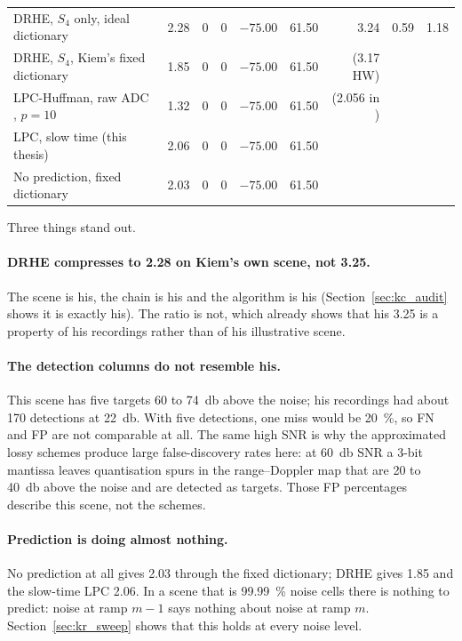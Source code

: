 \begin{table}[htbp]
\begin{tabular}{@{}lrrrrr@{\hskip 12pt}rrr@{}}
DRHE, $S_4$ only, ideal dictionary & 2.28 & 0 & 0 & $-75.00$ & 61.50 & 3.24 & 0.59 & 1.18\\
DRHE, $S_4$, Kiem's fixed dictionary & 1.85 & 0 & 0 & $-75.00$ & 61.50 & (3.17 HW) & & \\
LPC-Huffman, raw ADC \cite{meucci2022}, $p=10$  & 1.32 & 0 & 0 & $-75.00$ & 61.50 & (2.056 in \cite{meucci2022}) & & \\
LPC, slow time (this thesis)       & 2.06 & 0 & 0 & $-75.00$ & 61.50 & & & \\
No prediction, fixed dictionary    & 2.03 & 0 & 0 & $-75.00$ & 61.50 & & & \\
\bottomrule
\end{tabular}
\end{table}

\noindent
Three things stand out.

\paragraph{DRHE compresses to 2.28 on Kiem's own scene, not 3.25.} The scene
is his, the chain is his and the algorithm is his (Section~\ref{sec:kc_audit}
shows it is exactly his). The ratio is not, which already shows that his 3.25
is a property of his recordings rather than of his illustrative scene.

\paragraph{The detection columns do not resemble his.} This scene has five
targets 60 to \SI{74}{\decibel} above the noise; his recordings had about 170
detections at \SI{22}{\decibel}. With five detections, one miss would be
\SI{20}{\percent}, so FN and FP are not comparable at all. The same high SNR is
why the approximated lossy schemes produce large false-discovery rates here: at
\SI{60}{\decibel} SNR a 3-bit mantissa leaves quantisation spurs in the
range--Doppler map that are 20 to \SI{40}{\decibel} above the noise and are
detected as targets. Those FP percentages describe this scene, not the schemes.

\paragraph{Prediction is doing almost nothing.} No prediction at all gives 2.03
through the fixed dictionary; DRHE gives 1.85 and the slow-time LPC 2.06. In a
scene that is \SI{99.99}{\percent} noise cells there is nothing to predict:
noise at ramp $m-1$ says nothing about noise at ramp $m$.
Section~\ref{sec:kr_sweep} shows that this holds at every noise level.

